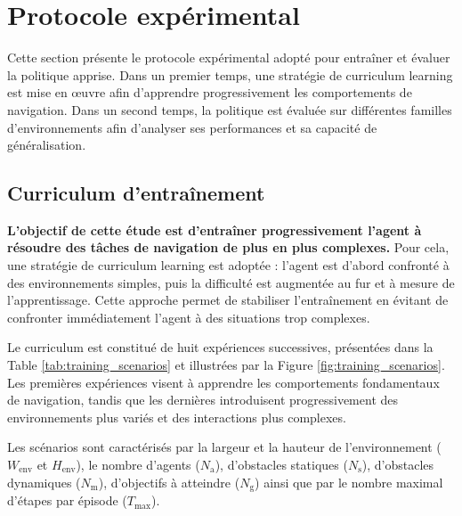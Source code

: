 \section{Protocole expérimental}

\begin{tcolorbox}[colback=black!5,colframe=black,title=]
    Cette section présente le protocole expérimental adopté pour entraîner et évaluer la politique apprise. Dans un premier temps, une stratégie de curriculum learning \citep{bengio2009, narvekar2020} est mise en œuvre afin d'apprendre progressivement les comportements de navigation. Dans un second temps, la politique est évaluée sur différentes familles d'environnements afin d'analyser ses performances et sa capacité de généralisation.
\end{tcolorbox}



\subsection{Curriculum d'entraînement}

\noindent \textbf{L'objectif de cette étude est d'entraîner progressivement l'agent à résoudre des tâches de navigation de plus en plus complexes.} Pour cela, une stratégie de curriculum learning est adoptée : l'agent est d'abord confronté à des environnements simples, puis la difficulté est augmentée au fur et à mesure de l'apprentissage. Cette approche permet de stabiliser l'entraînement en évitant de confronter immédiatement l'agent à des situations trop complexes.

\vspace{10pt}

\noindent Le curriculum est constitué de huit expériences successives, présentées dans la Table \ref{tab:training_scenarios} et illustrées par la Figure \ref{fig:training_scenarios}. Les premières expériences visent à apprendre les comportements fondamentaux de navigation, tandis que les dernières introduisent progressivement des environnements plus variés et des interactions plus complexes.

\vspace{10pt}

\noindent Les scénarios sont caractérisés par la largeur et la hauteur de l'environnement ($W_{\text{env}}$ et $H_{\text{env}}$), le nombre d'agents ($N_{\text{a}}$), d'obstacles statiques ($N_{\text{s}}$), d'obstacles dynamiques ($N_{\text{m}}$), d'objectifs à atteindre ($N_{\text{g}}$) ainsi que par le nombre maximal d'étapes par épisode ($T_{\text{max}}$).

